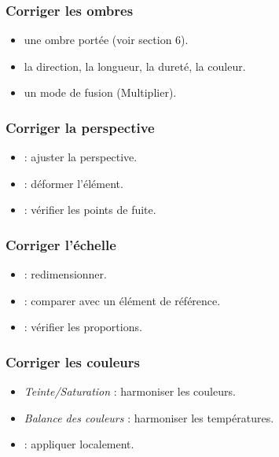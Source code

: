 \subsubsection{Corriger les ombres}

\begin{itemize}
    \item {} une ombre portée (voir section 6).
    \item {} la direction, la longueur, la dureté, la couleur.
    \item {} un mode de fusion (Multiplier).
\end{itemize}

\subsubsection{Corriger la perspective}

\begin{itemize}
    \item {} : ajuster la perspective.
    \item {} : déformer l'élément.
    \item {} : vérifier les points de fuite.
\end{itemize}

\subsubsection{Corriger l'échelle}

\begin{itemize}
    \item {} : redimensionner.
    \item {} : comparer avec un élément de référence.
    \item {} : vérifier les proportions.
\end{itemize}

\subsubsection{Corriger les couleurs}

\begin{itemize}
    \item {} \emph{Teinte/Saturation} : harmoniser les couleurs.
    \item {} \emph{Balance des couleurs} : harmoniser les températures.
    \item {} : appliquer localement.
\end{itemize}

